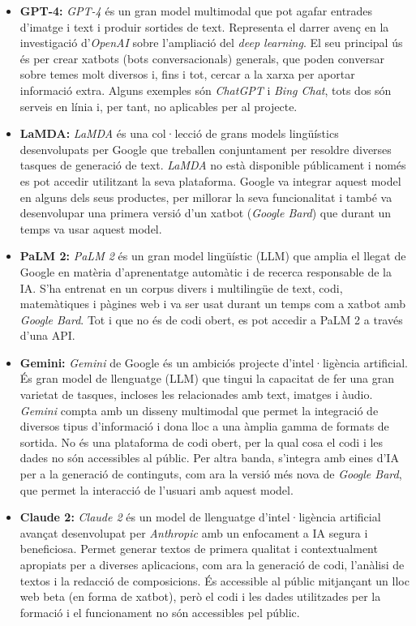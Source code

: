 \begin{itemize}
  \item \textbf{GPT-4:} \textit{GPT-4} és un gran model multimodal que pot agafar entrades d'imatge i text i produir sortides de text. Representa el darrer avenç en la investigació d'\textit{OpenAI} sobre l'ampliació del \textit{deep learning}. El seu principal ús és per crear xatbots (bots conversacionals) generals, que poden conversar sobre temes molt diversos i, fins i tot, cercar a la xarxa per aportar informació extra. Alguns exemples són \textit{ChatGPT} i \textit{Bing Chat}, tots dos són serveis en línia i, per tant, no aplicables per al projecte.
  \item \textbf{LaMDA:} \textit{LaMDA} és una col·lecció de grans models lingüístics desenvolupats per Google que treballen conjuntament per resoldre diverses tasques de generació de text. \textit{LaMDA} no està disponible públicament i només es pot accedir utilitzant la seva plataforma. Google va integrar aquest model en alguns dels seus productes, per millorar la seva funcionalitat i també va desenvolupar una primera versió d'un xatbot (\textit{Google Bard}) que durant un temps va usar aquest model.
  \item \textbf{PaLM 2:} \textit{PaLM 2} és un gran model lingüístic (LLM) que amplia el llegat de Google en matèria d'aprenentatge automàtic i de recerca responsable de la IA. S'ha entrenat en un corpus divers i multilingüe de text, codi, matemàtiques i pàgines web i va ser usat durant un temps com a xatbot amb \textit{Google Bard}. Tot i que no és de codi obert, es pot accedir a PaLM 2 a través d'una API.
  \item \textbf{Gemini:} \textit{Gemini} de Google és un ambiciós projecte d'intel·ligència artificial. És gran model de llenguatge (LLM) que tingui la capacitat de fer una gran varietat de tasques, incloses les relacionades amb text, imatges i àudio. \textit{Gemini} compta amb un disseny multimodal que permet la integració de diversos tipus d'informació i dona lloc a una àmplia gamma de formats de sortida. No és una plataforma de codi obert, per la qual cosa el codi i les dades no són accessibles al públic. Per altra banda, s'integra amb eines d'IA per a la generació de continguts, com ara la versió més nova de \textit{Google Bard}, que permet la interacció de l'usuari amb aquest model.
  \item \textbf{Claude 2:} \textit{Claude 2} és un model de llenguatge d'intel·ligència artificial avançat desenvolupat per \textit{Anthropic} amb un enfocament a IA segura i beneficiosa. Permet generar textos de primera qualitat i contextualment apropiats per a diverses aplicacions, com ara la generació de codi, l'anàlisi de textos i la redacció de composicions. És accessible al públic mitjançant un lloc web beta (en forma de xatbot), però el codi i les dades utilitzades per la formació i el funcionament no són accessibles pel públic.

\end{itemize}
